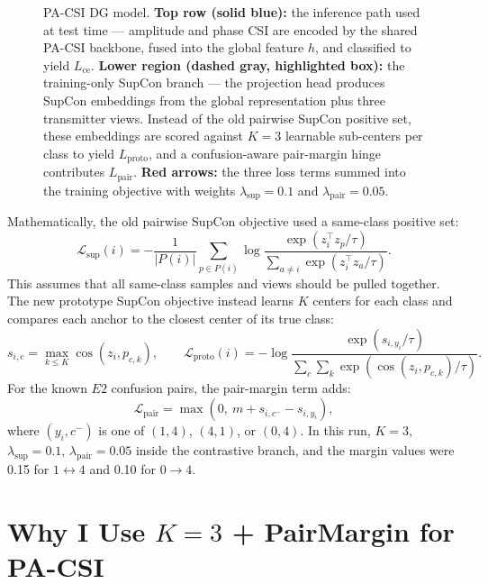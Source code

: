 \documentclass[11pt]{article}
\begin{document}
\begin{figure}[H]
{%
}
\caption{PA-CSI DG model. \textbf{Top row (solid blue):} the inference path used at test time --- amplitude and phase CSI are encoded by the shared PA-CSI backbone, fused into the global feature $h$, and classified to yield $L_{\mathrm{ce}}$. \textbf{Lower region (dashed gray, highlighted box):} the training-only SupCon branch --- the projection head produces SupCon embeddings from the global representation plus three transmitter views. Instead of the old pairwise SupCon positive set, these embeddings are scored against $K{=}3$ learnable sub-centers per class to yield $L_{\mathrm{proto}}$, and a confusion-aware pair-margin hinge contributes $L_{\mathrm{pair}}$. \textbf{Red arrows:} the three loss terms summed into the training objective with weights $\lambda_{\mathrm{sup}}{=}0.1$ and $\lambda_{\mathrm{pair}}{=}0.05$.}
\label{fig:model_reminder}
\end{figure}

Mathematically, the old pairwise SupCon objective used a same-class positive set:
\[
\mathcal{L}_{\mathrm{sup}}(i)
=
-\frac{1}{|P(i)|}
\sum_{p\in P(i)}
\log
\frac{\exp(z_i^\top z_p / \tau)}
{\sum_{a\neq i}\exp(z_i^\top z_a / \tau)} .
\]
This assumes that all same-class samples and views should be pulled together. The new prototype SupCon objective instead learns $K$ centers for each class and compares each anchor to the closest center of its true class:
\[
s_{i,c}=\max_{k\le K}\cos(z_i,p_{c,k}),
\qquad
\mathcal{L}_{\mathrm{proto}}(i)
=
-\log
\frac{\exp(s_{i,y_i}/\tau)}
{\sum_c\sum_k \exp(\cos(z_i,p_{c,k})/\tau)} .
\]
For the known $E2$ confusion pairs, the pair-margin term adds:
\[
\mathcal{L}_{\mathrm{pair}}
=
\max(0,\ m + s_{i,c^-} - s_{i,y_i}),
\]
where $(y_i,c^-)$ is one of $(1,4)$, $(4,1)$, or $(0,4)$. In this run, $K=3$, $\lambda_{\mathrm{sup}}=0.1$, $\lambda_{\mathrm{pair}}=0.05$ inside the contrastive branch, and the margin values were 0.15 for $1{\leftrightarrow}4$ and 0.10 for $0{\rightarrow}4$.

\section{Why I Use $K=3$ + PairMargin for PA-CSI}
\end{document}
